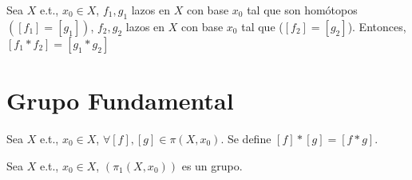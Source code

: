 \begin{cor}
  Sea $X$ e.t., $x_{0} \in X$, $f_{1}, g_{1}$ lazos en $X$ con base $x_{0}$ tal que son homótopos $([f_{1}] = [g_{1}])$, $f_{2}, g_{2}$ lazos en $X$ con base $x_{0}$ tal que ($[f_{2}] = [g_{2}]$). Entonces, $[f_{1} * f_{2}] = [g_{1} * g_{2}]$
\end{cor}

\section{Grupo Fundamental}

\begin{defn}
  Sea $X$ e.t., $x_{0} \in X$, $\forall [f], [g] \in \pi(X, x_{0})$. Se define $[f] * [g] = [f * g]$.
\end{defn}

\begin{theo}
  Sea $X$ e.t., $x_{0} \in X$, $(\pi_{1}(X, x_{0}))$ es un grupo.
\end{theo}

